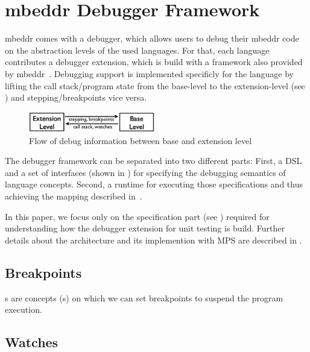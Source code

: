 \section{mbeddr Debugger Framework}
\label{mbeddrDebugger}
\label{mbeddrDebuggerFramework}

mbeddr comes with a debugger, which allows users to debug their mbeddr code 
on the abstraction levels of the used languages. For that, each language
contributes a debugger extension, which is build with a framework also provided
by mbeddr~\cite{DBLP:conf/adaEurope/AdaEuropeDeb}.
Debugging support is implemented specificly for the language by
lifting the call stack/program state from the base-level to the
extension-level (see ) and stepping/breakpoints
vice versa.

\begin{figure}[h]
  \vspace{-2mm}
  \centering
    \includegraphics[width=5.5cm]{./figures/two-levels.png} 
    \vspace{-2mm}
    \caption{Flow of debug information between base and
    extension level~\cite{DBLP:conf/adaEurope/AdaEuropeDeb}}
  \label{infoFlow}
  \vspace{-2mm}
\end{figure}



The debugger framework can be separated into two different parts: First, a
\ac{DSL} and a set of interfaces (shown in ) for specifying the
debugging semantics of language concepts. 
Second, a runtime for executing those specifications and
thus achieving the mapping described in~. 

In this paper, we focus only on the specification part (see
) required for understanding how the debugger extension
for unit testing is build.
Further details about the architecture and its implemention with \ac{MPS} are
described in \cite{DBLP:conf/adaEurope/AdaEuropeDeb}. 


\subsection{Breakpoints}
s are concepts (\eg {}s) on which
we can set breakpoints to suspend the program execution.


\subsection{Watches}


